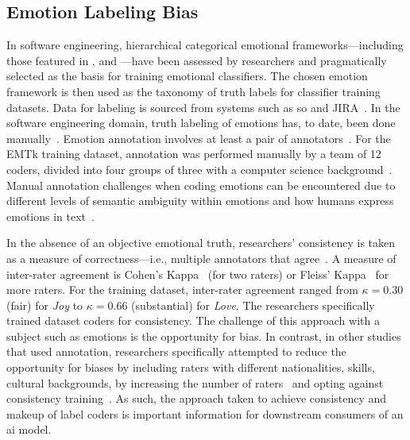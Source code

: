 \subsection{Emotion Labeling Bias}\label{caise2021:SubSubSection:EmotionLabelingBias}
In software engineering, hierarchical categorical emotional frameworks---including those featured in \citet{Parrott2001}, \citet{Ekman1978} and \citet{shaver1987}---have been assessed by researchers and pragmatically selected as the basis for training emotional classifiers.  The chosen emotion framework is then used as the taxonomy of truth labels for classifier training datasets.  Data for labeling is sourced from systems such as \gls{so} and JIRA~\citep{murgia2014, ortu2016, gachechiladze2017, novielli2018}.  In the software engineering domain, truth labeling of emotions has, to date, been done manually~\citep{murgia2014, novielli2018, gachechiladze2017}.  Emotion annotation involves at least a pair of annotators~\citep{Ghazi2010HierarchicalTexts, Aman2007IdentifyingText}. For the EMTk training dataset, annotation was performed manually by a team of 12 coders, divided into four groups of three with a computer science background~\citep{calefato2017, novielli2018}.  Manual annotation challenges when coding emotions can be encountered due to different levels of semantic ambiguity within emotions and how humans express emotions in text~\citep{Hasan2014UsingMessages}. 

In the absence of an objective emotional truth, researchers' consistency is taken as a measure of correctness---i.e., multiple annotators that agree~\citep{murgia2014}.  A measure of inter-rater agreement is Cohen's Kappa~\citep{Cohen:1960tf} (for two raters) or  Fleiss' Kappa~\citep{Fleiss:1971ff} for more raters.  For the training dataset, inter-rater agreement ranged from $\kappa=0.30$ (fair) for \textit{Joy} to $\kappa=0.66$ (substantial) for \textit{Love}.  The researchers specifically trained dataset coders for consistency. The challenge of this approach with a subject such as emotions is the opportunity for bias.  In contrast, in other studies that used annotation, researchers specifically attempted to reduce the opportunity for biases by including raters with different nationalities, skills, cultural backgrounds, by increasing the number of raters~\citep{ortu2016} and opting against consistency training~\citep{Alm2005EmotionsText}.  As such, the approach taken to achieve consistency and makeup of label coders is important information for downstream consumers of an \gls{ai} model.

